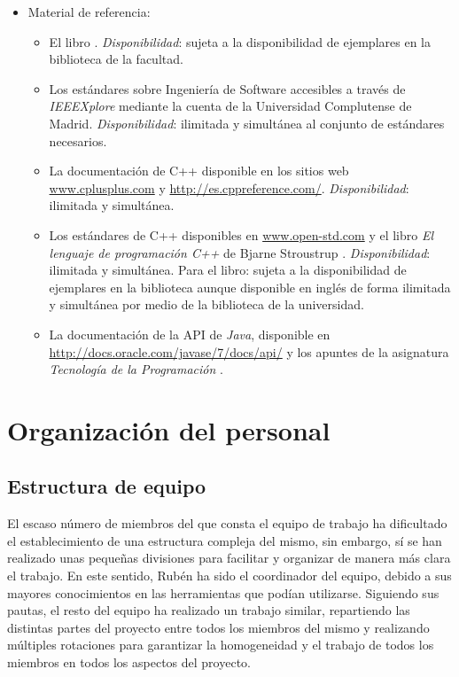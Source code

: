 \documentclass[11pt, a4paper, twoside]{report}
\begin{document}
\begin{itemize}
				\item Material de referencia: \begin{itemize}
					\item El libro \cite{PSMAN}.
					\subitem \textit{Disponibilidad}: sujeta a la disponibilidad de ejemplares en la biblioteca de la facultad.
					\item Los estándares sobre Ingeniería de Software accesibles a través de \textit{IEEEXplore\marcaregistrada} mediante la cuenta de la Universidad Complutense de Madrid.
					\subitem \textit{Disponibilidad}: ilimitada y simultánea al conjunto de estándares necesarios.
					\item La documentación de C++ disponible en los sitios web \url{www.cplusplus.com} y \url{http://es.cppreference.com/}.
					\subitem \textit{Disponibilidad}: ilimitada y simultánea.
					\item Los estándares de C++ disponibles en \url{www.open-std.com} y el libro \emph{El lenguaje de programación C++} de Bjarne Stroustrup \cite{STROUSTRUP}.
					\subitem \textit{Disponibilidad}: ilimitada y simultánea. Para el libro: sujeta a la disponibilidad de ejemplares en la biblioteca aunque disponible en inglés de forma ilimitada y simultánea por medio de la biblioteca de la universidad.
					\item La documentación de la API de \textit{Java}, disponible en \url{http://docs.oracle.com/javase/7/docs/api/} y los apuntes de la asignatura \textit{Tecnología de la Programación} \cite{AP_TP}.
				\end{itemize}
				
			\end{itemize}
	\section{Organización del personal}
		\subsection{Estructura de equipo}	%
		El escaso número de miembros del que consta el equipo de trabajo ha dificultado el establecimiento de una estructura compleja del mismo, sin embargo, sí se han realizado unas pequeñas divisiones para facilitar y organizar de manera más clara el trabajo. En este sentido, Rubén ha sido el coordinador del equipo, debido a sus mayores conocimientos en las herramientas que podían utilizarse. Siguiendo sus pautas, el resto del equipo ha realizado un trabajo similar, repartiendo las distintas partes del proyecto entre todos los miembros del mismo y realizando múltiples rotaciones para garantizar la homogeneidad y el trabajo de todos los miembros en todos los aspectos del proyecto.
\end{document}
